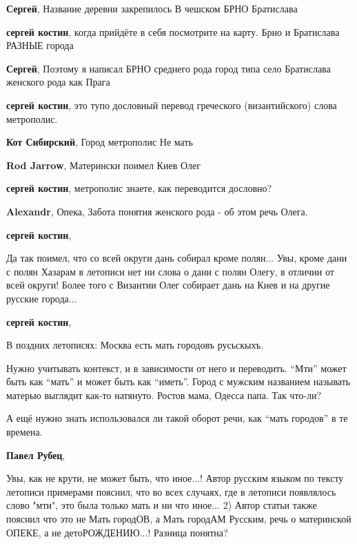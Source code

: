 \begin{itemize}
\begin{itemize}
\textbf{Сергей}, Название деревни закрепилось В чешском БРНО Братислава

\textbf{сергей костин}, когда прийдёте в себя посмотрите на карту. Брно и Братислава РАЗНЫЕ города

\textbf{Сергей}, Поэтому я написал БРНО среднего рода город типа село Братислава женского рода как Прага

\textbf{сергей костин}, это тупо дословный перевод греческого (византийского) слова метрополис.

\textbf{Кот Сибирский}, Город метрополис Не мать

\textbf{Rod Jarrow}, Матерински поимел Киев Олег

\textbf{сергей костин}, метрополис знаете, как переводится дословно?

\textbf{Alexandr}, Опека, Забота понятия женского рода - об этом речь Олега.

\textbf{сергей костин}, 

Да так поимел, что со всей округи дань собирал кроме полян... Увы, кроме дани с
полян Хазарам в летописи нет ни слова о дани с полян Олегу, в отличии от всей
округи! Более того с Византии Олег собирает дань на Киев и на другие русские
города...

\textbf{сергей костин}, 

В поздних летописях: Москва есть мать городовъ русьскыхъ.

\end{itemize} %


Нужно учитывать контекст, и в зависимости от него и переводить. \enquote{Мти} может быть
как \enquote{мать} и может быть как \enquote{иметь}. Город с мужским названием называть матерью
выглядит как-то натянуто. Ростов мама, Одесса папа. Так что-ли?

А ещё нужно знать использовался ли такой оборот речи, как \enquote{мать городов} в те
времена.

\begin{itemize} %
\textbf{Павел Рубец}, 

Увы, как не крути, не может быть, что иное...! Автор русским языком по тексту
летописи примерами пояснил, что во всех случаях, где в летописи появлялось
слово "мти", это была только мать и ни что иное... 2) Автор статьи также
пояснил что это не Мать городОВ, а Мать городАМ Русским, речь о материнской
ОПЕКЕ, а не детоРОЖДЕНИЮ...! Разница понятна?


\end{itemize}
\end{itemize}
